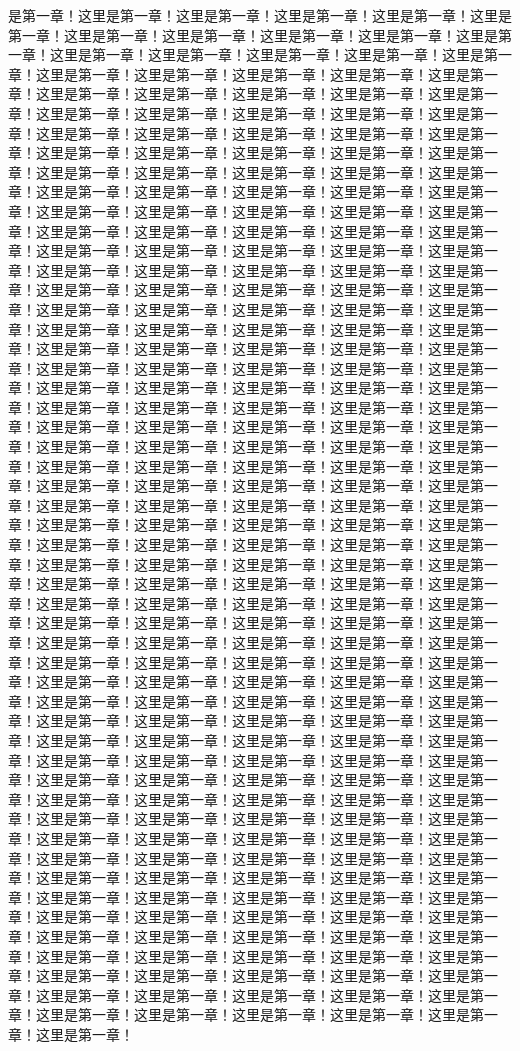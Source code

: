 是第一章！这里是第一章！这里是第一章！这里是第一章！这里是第一章！这里是第一章！这里是第一章！这里是第一章！这里是第一章！这里是第一章！这里是第一章！这里是第一章！这里是第一章！这里是第一章！这里是第一章！这里是第一章！这里是第一章！这里是第一章！这里是第一章！这里是第一章！这里是第一章！这里是第一章！这里是第一章！这里是第一章！这里是第一章！这里是第一章！这里是第一章！这里是第一章！这里是第一章！这里是第一章！这里是第一章！这里是第一章！这里是第一章！这里是第一章！这里是第一章！这里是第一章！这里是第一章！这里是第一章！这里是第一章！这里是第一章！这里是第一章！这里是第一章！这里是第一章！这里是第一章！这里是第一章！这里是第一章！这里是第一章！这里是第一章！这里是第一章！这里是第一章！这里是第一章！这里是第一章！这里是第一章！这里是第一章！这里是第一章！这里是第一章！这里是第一章！这里是第一章！这里是第一章！这里是第一章！这里是第一章！这里是第一章！这里是第一章！这里是第一章！这里是第一章！这里是第一章！这里是第一章！这里是第一章！这里是第一章！这里是第一章！这里是第一章！这里是第一章！这里是第一章！这里是第一章！这里是第一章！这里是第一章！这里是第一章！这里是第一章！这里是第一章！这里是第一章！这里是第一章！这里是第一章！这里是第一章！这里是第一章！这里是第一章！这里是第一章！这里是第一章！这里是第一章！这里是第一章！这里是第一章！这里是第一章！这里是第一章！这里是第一章！这里是第一章！这里是第一章！这里是第一章！这里是第一章！这里是第一章！这里是第一章！这里是第一章！这里是第一章！这里是第一章！这里是第一章！这里是第一章！这里是第一章！这里是第一章！这里是第一章！这里是第一章！这里是第一章！这里是第一章！这里是第一章！这里是第一章！这里是第一章！这里是第一章！这里是第一章！这里是第一章！这里是第一章！这里是第一章！这里是第一章！这里是第一章！这里是第一章！这里是第一章！这里是第一章！这里是第一章！这里是第一章！这里是第一章！这里是第一章！这里是第一章！这里是第一章！这里是第一章！这里是第一章！这里是第一章！这里是第一章！这里是第一章！这里是第一章！这里是第一章！这里是第一章！这里是第一章！这里是第一章！这里是第一章！这里是第一章！这里是第一章！这里是第一章！这里是第一章！这里是第一章！这里是第一章！这里是第一章！这里是第一章！这里是第一章！这里是第一章！这里是第一章！这里是第一章！这里是第一章！这里是第一章！这里是第一章！这里是第一章！这里是第一章！这里是第一章！这里是第一章！这里是第一章！这里是第一章！这里是第一章！这里是第一章！这里是第一章！这里是第一章！这里是第一章！这里是第一章！这里是第一章！这里是第一章！这里是第一章！这里是第一章！这里是第一章！这里是第一章！这里是第一章！这里是第一章！这里是第一章！这里是第一章！这里是第一章！这里是第一章！这里是第一章！这里是第一章！这里是第一章！这里是第一章！这里是第一章！这里是第一章！这里是第一章！这里是第一章！这里是第一章！这里是第一章！这里是第一章！这里是第一章！这里是第一章！这里是第一章！这里是第一章！这里是第一章！这里是第一章！这里是第一章！这里是第一章！这里是第一章！这里是第一章！这里是第一章！这里是第一章！这里是第一章！这里是第一章！这里是第一章！这里是第一章！这里是第一章！这里是第一章！这里是第一章！这里是第一章！这里是第一章！这里是第一章！这里是第一章！这里是第一章！这里是第一章！这里是第一章！这里是第一章！这里是第一章！这里是第一章！这里是第一章！这里是第一章！这里是第一章！这里是第一章！这里是第一章！这里是第一章！这里是第一章！这里是第一章！这里是第一章！这里是第一章！这里是第一章！这里是第一章！这里是第一章！这里是第一章！这里是第一章！这里是第一章！这里是第一章！这里是第一章！这里是第一章！这里是第一章！这里是第一章！这里是第一章！这里是第一章！这里是第一章！这里是第一章！这里是第一章！这里是第一章！这里是第一章！这里是第一章！这里是第一章！这里是第一章！这里是第一章！这里是第一章！这里是第一章！这里是第一章！这里是第一章！这里是第一章！这里是第一章！这里是第一章！这里是第一章！这里是第一章！这里是第一章！这里是第一章！